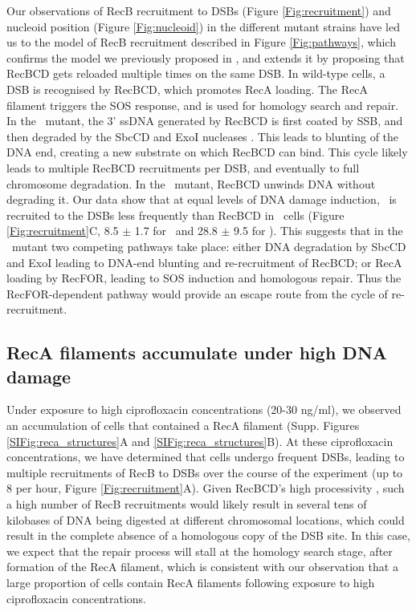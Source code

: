 Our observations of RecB recruitment to DSBs (Figure \ref{Fig:recruitment}) and nucleoid position (Figure \ref{Fig:nucleoid}) in the different mutant strains have led us to the model of RecB recruitment described in Figure \ref{Fig:pathways}, which confirms the model we previously proposed in \cite{Lepore2025}, and extends it by proposing that RecBCD gets reloaded multiple times on the same DSB. In wild-type cells, a DSB is recognised by RecBCD, which promotes RecA loading. The RecA filament triggers the SOS response, and is used for homology search and repair. In the \dreca\ mutant, the 3' ssDNA generated by RecBCD is first coated by SSB, and then degraded by the SbcCD and ExoI nucleases \cite{Zahradka2009}. This leads to blunting of the DNA end, creating a new substrate on which RecBCD can bind. This cycle likely leads to multiple RecBCD recruitments per DSB, and eventually to full chromosome degradation. In the \geneteneighty\ mutant, RecBCD unwinds DNA without degrading it. Our data show that at equal levels of DNA damage induction, \teneighty\ is recruited to the DSBs less frequently than RecBCD in \dreca\ cells (Figure \ref{Fig:recruitment}C, 8.5 $\pm$ 1.7 for \teneighty\ and 28.8 $\pm$ 9.5 for \dreca). This suggests that in the \geneteneighty\ mutant two competing pathways take place: either DNA degradation by SbcCD and ExoI leading to DNA-end blunting and re-recruitment of RecBCD; or RecA loading by RecFOR, leading to SOS induction and homologous repair. Thus the RecFOR-dependent pathway would provide an escape route from the cycle of re-recruitment.

\subsection*{RecA filaments accumulate under high DNA damage}
Under exposure to high ciprofloxacin concentrations (20-30 ng/ml), we observed an accumulation of cells that contained a RecA filament (Supp. Figures \ref{SIFig:reca_structures}A and \ref{SIFig:reca_structures}B). At these ciprofloxacin concentrations, we have determined that cells undergo frequent DSBs, leading to multiple recruitments of RecB to DSBs over the course of the experiment (up to 8 per hour, Figure \ref{Fig:recruitment}A). Given RecBCD's high processivity \cite{Wiktor2018}, such a high number of RecB recruitments would likely result in several tens of kilobases of DNA being digested at different chromosomal locations, which could result in the complete absence of a homologous copy of the DSB site. In this case, we expect that the repair process will stall at the homology search stage, after formation of the RecA filament, which is consistent with our observation that a large proportion of cells contain RecA filaments following exposure to high ciprofloxacin concentrations.

